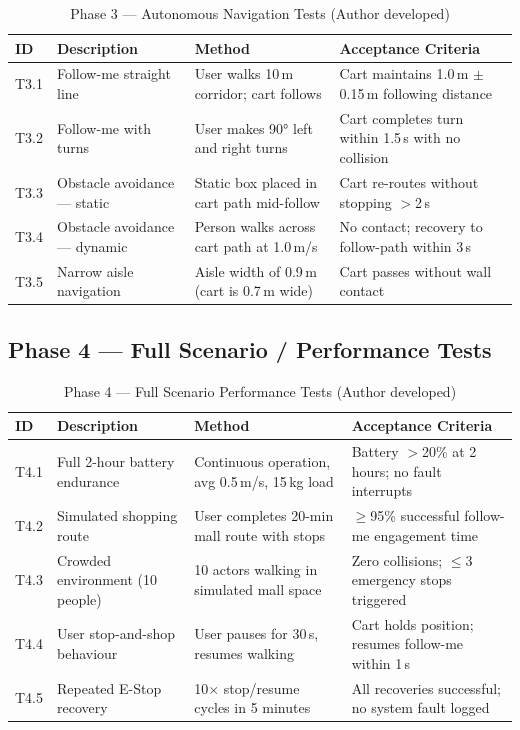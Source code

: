 \begin{table}[!ht]
\caption{Phase 3 --- Autonomous Navigation Tests (Author developed)}
\label{tab:phase3}
\centering
\footnotesize
\begin{tabular}{p{0.6cm} p{1.8cm} p{1.8cm} p{2.4cm}}
\toprule
\textbf{ID} & \textbf{Description} & \textbf{Method} & \textbf{Acceptance Criteria} \\
\midrule
T3.1 & Follow-me straight line & User walks 10\,m corridor; cart follows & Cart maintains 1.0\,m $\pm$ 0.15\,m following distance \\
T3.2 & Follow-me with turns & User makes 90° left and right turns & Cart completes turn within 1.5\,s with no collision \\
T3.3 & Obstacle avoidance --- static & Static box placed in cart path mid-follow & Cart re-routes without stopping $>$2\,s \\
T3.4 & Obstacle avoidance --- dynamic & Person walks across cart path at 1.0\,m/s & No contact; recovery to follow-path within 3\,s \\
T3.5 & Narrow aisle navigation & Aisle width of 0.9\,m (cart is 0.7\,m wide) & Cart passes without wall contact \\
\bottomrule
\end{tabular}
\end{table}

\subsection{Phase 4 --- Full Scenario / Performance Tests}

\begin{table}[!ht]
\caption{Phase 4 --- Full Scenario Performance Tests (Author developed)}
\label{tab:phase4}
\centering
\footnotesize
\begin{tabular}{p{0.6cm} p{1.8cm} p{1.8cm} p{2.4cm}}
\toprule
\textbf{ID} & \textbf{Description} & \textbf{Method} & \textbf{Acceptance Criteria} \\
\midrule
T4.1 & Full 2-hour battery endurance & Continuous operation, avg 0.5\,m/s, 15\,kg load & Battery $>$20\% at 2 hours; no fault interrupts \\
T4.2 & Simulated shopping route & User completes 20-min mall route with stops & $\geq$95\% successful follow-me engagement time \\
T4.3 & Crowded environment (10 people) & 10 actors walking in simulated mall space & Zero collisions; $\leq$3 emergency stops triggered \\
T4.4 & User stop-and-shop behaviour & User pauses for 30\,s, resumes walking & Cart holds position; resumes follow-me within 1\,s \\
T4.5 & Repeated E-Stop recovery & 10$\times$ stop/resume cycles in 5 minutes & All recoveries successful; no system fault logged \\
\bottomrule
\end{tabular}
\end{table}

